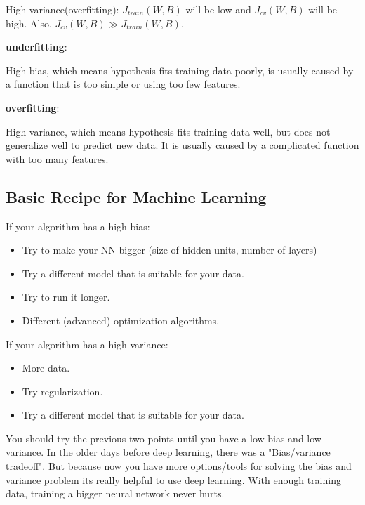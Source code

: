 \documentclass{article}
\begin{document}
\noindent High variance(overfitting): \(J_{train}(W, B)\) will be low and \(J_{cv}(W, B)\) will be high. Also, \(J_{cv}(W, B) \gg J_{train}(W, B)\). 

\bigskip

\noindent \textbf{underfitting}:

\noindent High bias, which means hypothesis fits training data poorly, is usually caused by a function that is too simple or using too few features. 

\bigskip

\noindent \textbf{overfitting}:

\noindent High variance, which means hypothesis fits training data well, but does not generalize well to predict new data. It is usually caused by a complicated function with too many features.

\subsection{Basic Recipe for Machine Learning}

\noindent If your algorithm has a high bias:

\begin{itemize}
  \item Try to make your NN bigger (size of hidden units, number of layers)
  \item Try a different model that is suitable for your data.
  \item Try to run it longer.
  \item Different (advanced) optimization algorithms.
\end{itemize}

\noindent If your algorithm has a high variance:

\begin{itemize}
  \item More data.
  \item Try regularization.
  \item Try a different model that is suitable for your data.
\end{itemize}

\noindent You should try the previous two points until you have a low bias and low variance. In the older days before deep learning, there was a "Bias/variance tradeoff". But because now you have more options/tools for solving the bias and variance problem its really helpful to use deep learning. With enough training data, training a bigger neural network never hurts.
\end{document}
